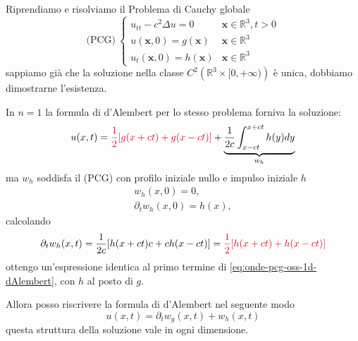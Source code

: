 \documentclass[10pt,a4paper,twoside,openright]{book}
\newcommand{\x}{\mathbf{x}}
\begin{document}
Riprendiamo e risolviamo il Problema di Cauchy globale
\begin{equation*}
	\text{(PCG)} \ 
	\begin{cases}
		u_{tt} -c^{2} \Delta u=0            & \x \in \mathbb{R}^{3} ,t >0 \\
		u(\x ,0) =g(\x)     & \x\mathbb{\in R}^{3}        \\
		u_{t}(\x ,0) =h(\x) & \x\mathbb{\in R}^{3}        
	\end{cases}
\end{equation*}
sappiamo già che la soluzione nella classe $\displaystyle C^{2}\left(\mathbb{R}^{3} \times [ 0,+\infty )\right)$ è unica, dobbiamo dimostrarne l'esistenza.
\begin{oss}
	In $\displaystyle n=1$ la formula di d'Alembert per lo stesso problema forniva la soluzione:
	\begin{equation}
		u( x,t) =\textcolor[rgb]{0.82,0.01,0.11}{\frac{1}{2}[g(x+ct)+g(x-ct)]} +\underbrace{\frac{1}{2c}\int _{x-ct}^{x+ct} h( y) dy}_{w_{h}}
		\label{eq:onde-pcg-oss-1d-dAlembert}
	\end{equation}
	ma $\displaystyle w_{h}$ soddisfa il (PCG) con profilo iniziale nullo e impulso iniziale $\displaystyle h$
	\begin{gather*}
		w_{h}( x,0) =0,\\
		\partial _{t} w_{h}( x,0) =h( x) ,
	\end{gather*}
	calcolando
	\begin{equation*}
		\partial _{t} w_{h}( x,t) =\frac{1}{2c}[ h( x+ct) c+ch( x-ct)] =\textcolor[rgb]{0.82,0.01,0.11}{\frac{1}{2}[h(x+ct)+h(x-ct)]}
	\end{equation*}
	ottengo un'espressione identica al primo termine di \eqref{eq:onde-pcg-oss-1d-dAlembert}, con $\displaystyle h$ al posto di $\displaystyle g$.
	
	Allora posso riscrivere la formula di d'Alembert nel seguente modo
	\begin{equation*}
		u( x,t) =\partial _{t} w_{g}( x,t) +w_{h}( x,t)
	\end{equation*}
	questa struttura della soluzione vale in ogni dimensione.
\end{oss}
\end{document}
